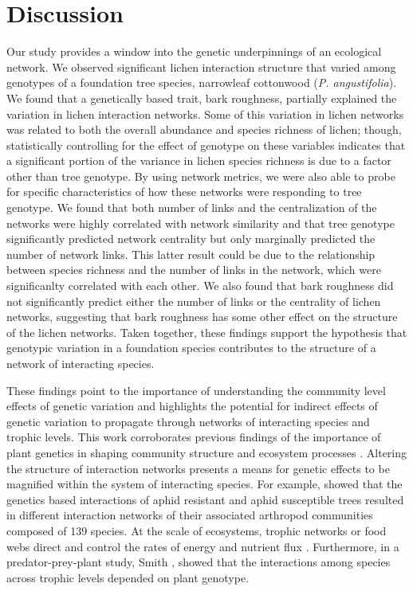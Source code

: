 \documentclass[9pt,twocolumn,twoside,lineno]{pnas-new}
\begin{document}
\section*{Discussion}

Our study provides a window into the genetic underpinnings of an
ecological network. We observed significant lichen interaction
structure that varied among genotypes of a foundation tree species,
narrowleaf cottonwood (\textit{P. angustifolia}). We found that a
genetically based trait, bark roughness, partially explained the
variation in lichen interaction networks. Some of this variation in
lichen networks was related to both the overall abundance and species
richness of lichen; though, statistically controlling for the effect
of genotype on these variables indicates that a significant portion of
the variance in lichen species richness is due to a factor other than
tree genotype. By using network metrics, we were also able to probe
for specific characteristics of how these networks were responding to
tree genotype. We found that both number of links and the
centralization of the networks were highly correlated with network
similarity and that tree genotype significantly predicted network
centrality but only marginally predicted the number of network
links. This latter result could be due to the relationship between
species richness and the number of links in the network, which were
significanlty correlated with each other. We also found that bark
roughness did not significantly predict either the number of links or
the centrality of lichen networks, suggesting that bark roughness has
some other effect on the structure of the lichen networks. Taken
together, these findings support the hypothesis that genotypic
variation in a foundation species contributes to the structure of a
network of interacting species.

These findings point to the importance of understanding the community
level effects of genetic variation and highlights the potential for
indirect effects of genetic variation to propagate through networks of
interacting species and trophic levels. This work corroborates
previous findings of the importance of plant genetics in shaping
community structure and ecosystem processes
\cite{Whitham2006a}. Altering the structure of interaction networks
presents a means for genetic effects to be magnified within the system
of interacting species. For example, \citep{Keith2017} showed that the
genetics based interactions of aphid resistant and aphid susceptible
trees resulted in different interaction networks of their associated
arthropod communities composed of 139 species. At the scale of
ecosystems, trophic networks or food webs direct and control the rates
of energy and nutrient flux \cite{Borgatti2006}. Furthermore, in a
predator-prey-plant study, Smith \cite{Smith2011}, showed that the
interactions among species across trophic levels depended on plant
genotype.
\end{document}
